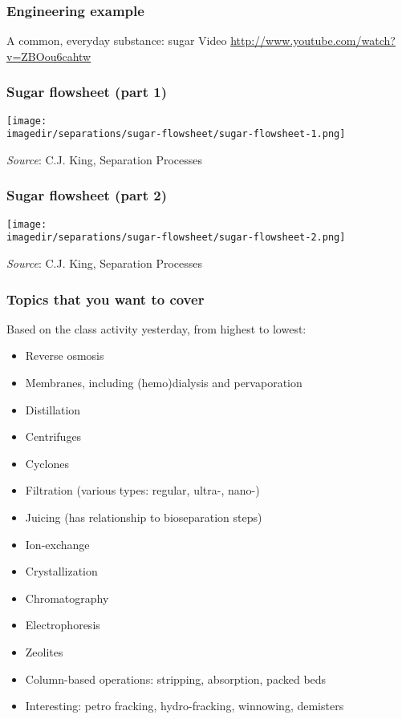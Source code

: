 \begin{frame}\frametitle{Engineering example}
	A common, everyday substance: sugar
	\vspace{36pt}
	Video \href{http://www.youtube.com/watch?v=ZBOou6cahtw}{http://www.youtube.com/watch?v=ZBOou6cahtw}	
\end{frame}

\begin{frame}\frametitle{Sugar flowsheet (part 1)}
	\begin{center}
		\texttt{[image: \\imagedir/separations/sugar-flowsheet/sugar-flowsheet-1.png]}
	\end{center}
	\emph{Source}: C.J. King, Separation Processes
\end{frame}

\begin{frame}\frametitle{Sugar flowsheet (part 2)}
	\begin{center}
		\texttt{[image: \\imagedir/separations/sugar-flowsheet/sugar-flowsheet-2.png]}
	\end{center}
	\emph{Source}: C.J. King, Separation Processes
\end{frame}

\begin{frame}\frametitle{Topics that you want to cover}
	Based on the class activity yesterday, from highest to lowest:
	\begin{itemize}
		\item	Reverse osmosis
		\item	Membranes, including (hemo)dialysis and pervaporation
		\item	Distillation
		\item	Centrifuges
		\item	Cyclones
		\item	Filtration (various types: regular, ultra-, nano-)
		\item	Juicing (has relationship to bioseparation steps)
		\item	Ion-exchange
		\item	Crystallization
		\item	Chromatography
		\item	Electrophoresis
		\item	Zeolites
		\item	Column-based operations: stripping, absorption, packed beds
		\item	Interesting: petro fracking, hydro-fracking, winnowing, demisters 
	\end{itemize}
\end{frame}

